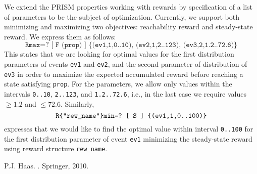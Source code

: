 \documentclass{article}
\renewcommand{\_}{\underline{~}}
\newcommand{\code}[1]{\texttt{#1}}
\begin{document}
We extend the PRISM properties working with rewards by specification of a list of parameters to be the subject of optimization. Currently, we support both minimizing and maximizing two objectives: reachability reward and steady-state reward. We express them as follows:
$$\code{Rmax=? [~F~(prop)~]~\{(ev1,1,0..10), (ev2,1,2..123), (ev3,2,1.2..72.6)\}}$$ 
This states that we are looking for optimal values for the first distribution parameters of events \code{ev1} and \code{ev2}, and the second parameter of distribution of \code{ev3} in order to  maximize the expected accumulated reward before reaching a state satisfying \code{prop}. For the parameters, we allow only values within the intervals \code{0..10}, \code{2..123}, and \code{1.2..72.6}, i.e., in the last case we require values $\geq 1.2$ and $\leq72.6$. Similarly,
$$\code{R\{"rew\_name"\}min=?~[~S~]~\{(ev1,1,0..100)\}}$$ 
expresses that we would like to find the optimal value within interval \code{0..100} for the first distribution parameter of event \code{ev1} minimizing the steady-state reward using reward structure \code{rew\_name}.


\begin{thebibliography}{1}
P.J. Haas.
.
\newblock Springer, 2010.
\end{thebibliography}
\end{document}
